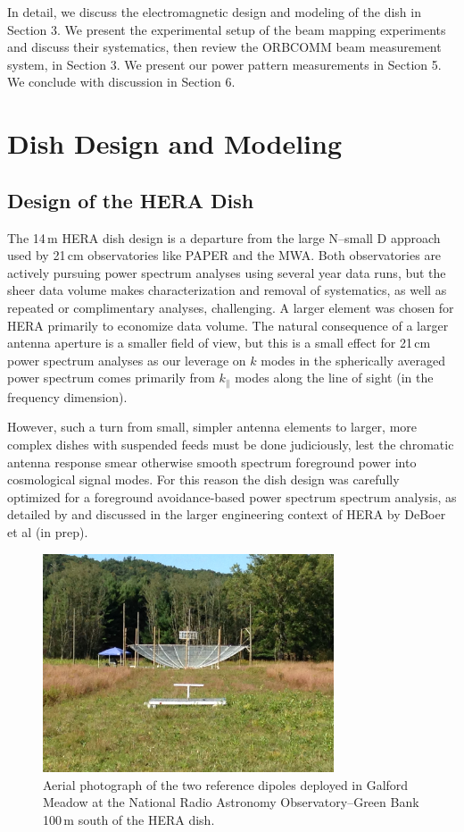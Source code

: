 \documentclass[preprint]{aastex}
\begin{document}
In detail, we discuss the electromagnetic design and modeling of the dish in Section 3. We present the 
experimental setup of the beam mapping experiments and discuss their systematics, then 
review the ORBCOMM beam measurement system, in Section 3. We present our power pattern 
measurements in Section 5. We conclude with discussion in Section 6.

\section{Dish Design and Modeling}

\subsection{Design of the HERA Dish}


The 14\,m HERA dish design is a departure from the large N--small D approach used by 21\,cm 
observatories like PAPER and the MWA. Both observatories are actively pursuing power 
spectrum analyses using several year data runs, but the sheer data volume makes 
characterization and removal of systematics, as well as repeated or complimentary analyses, 
challenging. A larger element was chosen for HERA primarily to economize data volume. 
The natural consequence of a larger antenna aperture is a smaller field of view, but this is a 
small effect for 21\,cm power spectrum analyses as our leverage on $k$ modes in the 
spherically averaged power spectrum comes primarily from $k_\parallel$ modes along the line 
of sight (in the frequency dimension).

However, such a turn from small, simpler antenna elements to larger, more complex dishes with 
suspended feeds must be done judiciously, lest the chromatic antenna response smear otherwise 
smooth spectrum foreground power into cosmological signal modes. For this reason the dish 
design was carefully optimized for a foreground avoidance-based power spectrum spectrum 
analysis, as detailed by \citet{heraMemo5} and discussed in the larger engineering context of 
HERA by DeBoer et al (in prep). 

\begin{figure}[h]
\includegraphics[width=3.4in]{IMG_0353.JPG}
\caption{Aerial photograph of the two reference dipoles deployed in Galford Meadow at the National Radio Astronomy Observatory--Green Bank 100\,m south of the HERA dish.}
\label{fig:dishphoto}
\end{figure}
\end{document}
